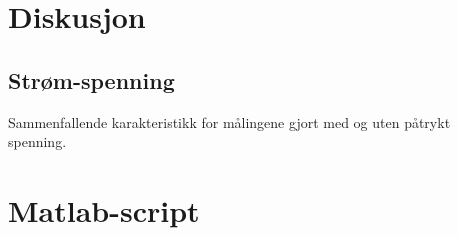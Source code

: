 \documentclass[a4paper,11pt, twocolumn]{article}
\begin{document}
\section{Diskusjon}
\subsection{Strøm-spenning}
Sammenfallende karakteristikk for målingene gjort med og uten påtrykt spenning.

\clearpage
\onecolumn
\appendix


\section{Matlab-script}
\end{document}
